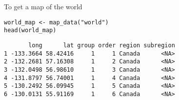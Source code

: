 \documentclass{beamer}
\begin{document}
\begin{frame}[fragile]
To get a map of the world
\begin{framed}
\begin{verbatim}
world_map <- map_data("world")
head(world_map)
\end{verbatim}
\end{framed}

\begin{verbatim}
       long      lat group order region subregion
1 -133.3664 58.42416     1     1 Canada      <NA>
2 -132.2681 57.16308     1     2 Canada      <NA>
3 -132.0498 56.98610     1     3 Canada      <NA>
4 -131.8797 56.74001     1     4 Canada      <NA>
5 -130.2492 56.09945     1     5 Canada      <NA>
6 -130.0131 55.91169     1     6 Canada      <NA>
\end{verbatim}

\end{frame}
\end{document}
